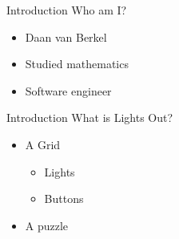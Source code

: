 \begin{frame}{Introduction}
	Who am I?
	\begin{itemize}
		\item Daan van Berkel
		\item Studied mathematics
		\item Software engineer
	\end{itemize}
\end{frame}

\begin{frame}{Introduction}
	What is Lights Out?
	\begin{itemize}
		\item A Grid
		\begin{itemize}
			\item Lights
			\item Buttons
		\end{itemize}
		\item A puzzle
	\end{itemize}
\end{frame}
